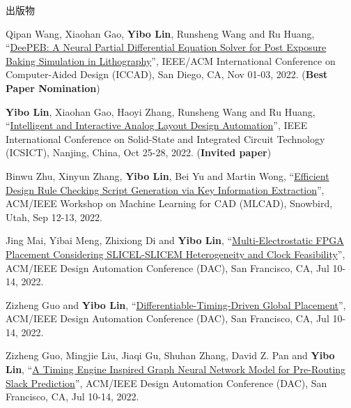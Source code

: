 \begin{rSection}{出版物}
\begin{description}[font=\normalfont, rightmargin=2em]
{}
            

\item[{[C68]}]{
        Qipan Wang, Xiaohan Gao, \textbf{Yibo Lin}, Runsheng Wang and Ru Huang, 
    ``\href{https://doi.org/10.1145/3508352.3549398}{DeePEB: A Neural Partial Differential Equation Solver for Post Exposure Baking Simulation in Lithography}'', 
    IEEE/ACM International Conference on Computer-Aided Design (ICCAD), San Diego, CA, Nov 01-03, 2022.
    (\textbf{Best Paper Nomination})
}
            

\item[{[C67]}]{
        \textbf{Yibo Lin}, Xiaohan Gao, Haoyi Zhang, Runsheng Wang and Ru Huang, 
    ``\href{https://doi.org/10.1109/ICSICT55466.2022.9963217}{Intelligent and Interactive Analog Layout Design Automation}'', 
    IEEE International Conference on Solid-State and Integrated Circuit Technology (ICSICT), Nanjing, China, Oct 25-28, 2022.
    (\textbf{Invited paper})
}
            

\item[{[C66]}]{
        Binwu Zhu, Xinyun Zhang, \textbf{Yibo Lin}, Bei Yu and Martin Wong, 
    ``\href{https://doi.org/10.1145/3551901.3556494}{Efficient Design Rule Checking Script Generation via Key Information Extraction}'', 
    ACM/IEEE Workshop on Machine Learning for CAD (MLCAD), Snowbird, Utah, Sep 12-13, 2022.
    
}
            

\item[{[C65]}]{
        Jing Mai, Yibai Meng, Zhixiong Di and \textbf{Yibo Lin}, 
    ``\href{https://doi.org/10.1145/3489517.3530568}{Multi-Electrostatic FPGA Placement Considering SLICEL-SLICEM Heterogeneity and Clock Feasibility}'', 
    ACM/IEEE Design Automation Conference (DAC), San Francisco, CA, Jul 10-14, 2022.
    
}
            

\item[{[C64]}]{
        Zizheng Guo and \textbf{Yibo Lin}, 
    ``\href{https://doi.org/10.1145/3489517.3530486}{Differentiable-Timing-Driven Global Placement}'', 
    ACM/IEEE Design Automation Conference (DAC), San Francisco, CA, Jul 10-14, 2022.
    
}
            

\item[{[C63]}]{
        Zizheng Guo, Mingjie Liu, Jiaqi Gu, Shuhan Zhang, David Z. Pan and \textbf{Yibo Lin}, 
    ``\href{https://doi.org/10.1145/3489517.3530597}{A Timing Engine Inspired Graph Neural Network Model for Pre-Routing Slack Prediction}'', 
    ACM/IEEE Design Automation Conference (DAC), San Francisco, CA, Jul 10-14, 2022.
    
}
\end{description}
\end{rSection}
